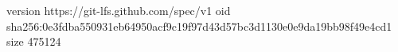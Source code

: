 version https://git-lfs.github.com/spec/v1
oid sha256:0e3fdba550931eb64950acf9c19f97d43d57bc3d1130e0e9da19bb98f49e4cd1
size 475124

